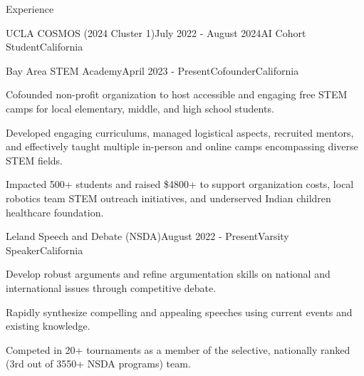 \documentclass[
  11pt, %
]{public/resume/resume} %
\begin{document}
\begin{rSection}{Experience}
\begin{rSubsection}{UCLA COSMOS (2024 Cluster 1)}{July 2022 - August 2024}{AI Cohort Student}{California}
  \end{rSubsection}
        
  \begin{rSubsection}{Bay Area STEM Academy}{April 2023 - Present}{Cofounder}{California}
    
    \item Cofounded non-profit organization to host accessible and engaging free STEM camps for local elementary, middle, and high school students.
    
    \item Developed engaging curriculums, managed logistical aspects, recruited mentors, and effectively taught multiple in-person and online camps encompassing diverse STEM fields.
    
    \item Impacted 500+ students and raised \$4800+ to support organization costs, local robotics team STEM outreach initiatives, and underserved Indian children healthcare foundation.
    
  \end{rSubsection}
        
  \begin{rSubsection}{Leland Speech and Debate (NSDA)}{August 2022 - Present}{Varsity Speaker}{California}
    
    \item Develop robust arguments and refine argumentation skills on national and international issues through competitive debate.
    
    \item Rapidly synthesize compelling and appealing speeches using current events and existing knowledge.
    
    \item Competed in 20+ tournaments as a member of the selective, nationally ranked (3rd out of 3550+ NSDA programs) team.
    
  \end{rSubsection}
        
	
\end{rSection}

\end{document}
